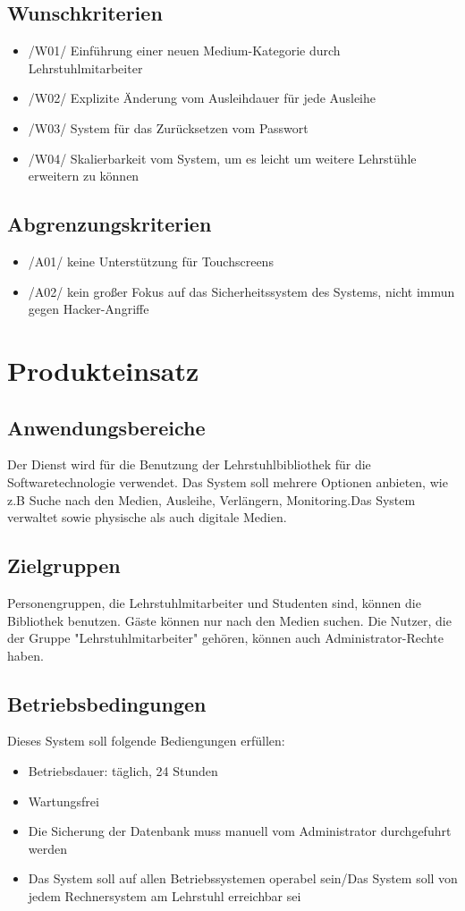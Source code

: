 \documentclass[12pt, a4paper]{article}
\begin{document}
\subsection{Wunschkriterien}
\begin{itemize}
	\item /W01/ Einführung einer neuen Medium-Kategorie durch Lehrstuhlmitarbeiter
	\item /W02/ Explizite Änderung vom Ausleihdauer für jede Ausleihe
	\item /W03/ System für das Zurücksetzen vom Passwort
	\item /W04/ Skalierbarkeit vom System, um es leicht um weitere Lehrstühle erweitern zu können
\end{itemize}
\subsection{Abgrenzungskriterien}
\begin{itemize}
	\item /A01/ keine Unterstützung für Touchscreens
	\item /A02/ kein großer Fokus auf das Sicherheitssystem des Systems, nicht immun gegen Hacker-Angriffe
\end{itemize}
\pagebreak

\section{Produkteinsatz}
\subsection{Anwendungsbereiche}
Der Dienst wird für die Benutzung der Lehrstuhlbibliothek für die Softwaretechnologie verwendet.  Das System soll mehrere Optionen anbieten, wie z.B Suche nach den Medien, Ausleihe, Verlängern, Monitoring.Das System verwaltet sowie physische als auch digitale Medien.
\subsection{Zielgruppen}
Personengruppen, die Lehrstuhlmitarbeiter und Studenten sind, können die Bibliothek benutzen. Gäste können nur nach den Medien suchen. Die Nutzer, die der Gruppe "Lehrstuhlmitarbeiter" gehören, können auch Administrator-Rechte haben.
\subsection{Betriebsbedingungen}
Dieses System soll folgende Bediengungen erfüllen:
\begin{itemize}
\item Betriebsdauer: täglich, 24 Stunden
\item Wartungsfrei
\item Die Sicherung der Datenbank muss manuell vom Administrator durchgefuhrt werden
\item Das System soll auf allen Betriebssystemen operabel sein/Das System soll von jedem Rechnersystem am Lehrstuhl erreichbar sei
\end{itemize}
\pagebreak
\end{document}
